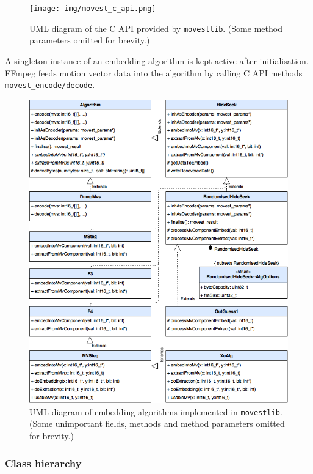 \documentclass[12pt,british,twoside,notitlepage,usenames,dvipsnames,hypens,final]{report}
\numberwithin{equation}{section}
\numberwithin{figure}{section}
\begin{document}
\begin{figure}[tbh]
\centering
\texttt{[image: img/movest\_c\_api.png]}
\caption{UML diagram of the C API provided by \texttt{movestlib}. (Some method parameters omitted for brevity.)}
\label{fig:movest-c-api}
\end{figure}

A singleton instance of an embedding algorithm is kept active after initialisation. FFmpeg feeds motion vector data into the algorithm by calling C API methods \texttt{movest\_encode/decode}.  

\begin{figure}[!htbp]
\centering
\includegraphics[width=\textwidth]{img/movest_alg_class_diag.png}
\caption{UML diagram of embedding algorithms implemented in \texttt{movestlib}. (Some unimportant fields, methods and method parameters omitted for brevity.)}
\label{fig:movest_alg_class_diag}
\end{figure}

\subsubsection{Class hierarchy}
\end{document}
